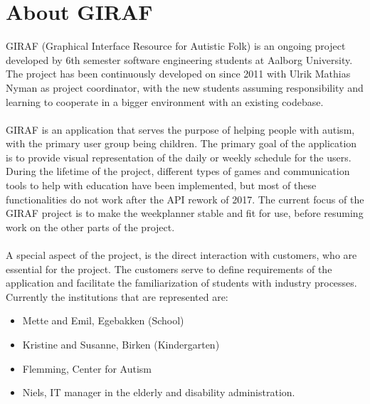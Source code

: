 \section{About GIRAF}
GIRAF (Graphical Interface Resource for Autistic Folk) is an ongoing project developed by 6th semester software engineering students at Aalborg University. 
The project has been continuously developed on since 2011 with Ulrik Mathias Nyman as project coordinator, with the new students assuming responsibility and learning to cooperate in a bigger environment with an existing codebase. 
\\\\
GIRAF is an application that serves the purpose of helping people with autism, with the primary user group being children.
The primary goal of the application is to provide visual representation of the daily or weekly schedule for the users.
During the lifetime of the project, different types of games and communication tools to help with education have been implemented, but most of these functionalities do not work after the API rework of 2017. The current focus of the GIRAF project is to make the weekplanner stable and fit for use, before resuming work on the other parts of the project. 
\\\\
A special aspect of the project, is the direct interaction with customers, who are essential for the project.
The customers serve to define requirements of the application and facilitate the familiarization of students with industry processes.
\\
\noindent
Currently the institutions that are represented are: 
\begin{itemize}
    \item Mette and Emil, Egebakken (School)
    \item Kristine and Susanne, Birken (Kindergarten)
    \item Flemming, Center for Autism
    \item Niels, IT manager in the elderly and disability administration.
\end{itemize}
